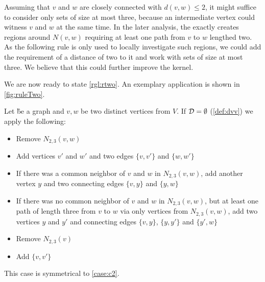 Assuming that $v$ and $w$ are closely connected with $d(v,w) \leq 2$, it might suffice to consider only sets of size at most three, because an intermediate vertex could witness $v$ and $w$ at the same time. In the later analysis, the \dreg exactly creates regions around $N(v,w)$ requiring at least one path from $v$ to $w$ lengthed two. As the following rule is only used to locally investigate such regions, we could add the requirement of a distance of two to it and work with sets of size at most three. We believe that this could further improve the kernel. 

We are now ready to state \cref{rgl:rtwo}. An exemplary application is shown in \cref{fig:ruleTwo}.

\begin{rgl}\label{rgl:rtwo}
    Let \G be a graph and $v, w$ be two distinct vertices from $V$. If $\mathbf{\mathcal{D} = \emptyset}$ (\cref{def:dvv}) we apply the following:
    \begin{caseof}

        \vspace{-5mm}
        \begin{itemize}
            \item Remove $N_{2,3}(v,w)$
            \item Add vertices $v'$ and $w'$ and two edges $\{v, v'\}$ and $\{w, w'\}$
            \item If there was a common neighbor of $v$ and $w$ in $N_{2,3}(v,w)$, add another vertex $y$ and two connecting edges  $\{v, y\}$ and $\{y, w\}$
            \item If there was no common neighbor of $v$ and $w$ in $N_{2,3}(v,w)$, but at least one path of length three from $v$ to $w$ via only vertices from $N_{2,3}(v,w)$, add two vertices $y$ and $y'$ and connecting edges $\{v,y\}$, $\{y, y'\}$ and $\{y', w\}$
        \end{itemize}

        \vspace{-5mm}
        \begin{itemize}
            \item Remove $N_{2,3}(v)$
            \item Add $\{v, v'\}$
        \end{itemize}
        
         This case is symmetrical to \cref{case:c2}.
    \end{caseof}
\end{rgl}

